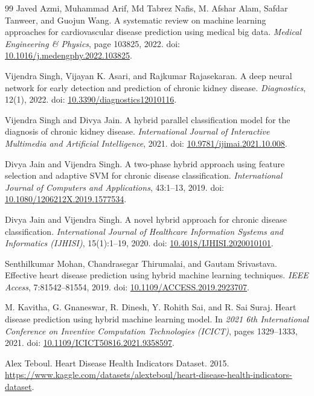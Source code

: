 \begin{thebibliography}{99}
 Javed Azmi, Muhammad Arif, Md Tabrez Nafis, M. Afshar Alam, Safdar Tanweer, and Guojun Wang. A systematic review on machine learning approaches for cardiovascular disease prediction using medical big data. \emph{Medical Engineering \& Physics}, page 103825, 2022. doi: \href{https://doi.org/10.1016/j.medengphy.2022.103825}{10.1016/j.medengphy.2022.103825}.

 Vijendra Singh, Vijayan K. Asari, and Rajkumar Rajasekaran. A deep neural network for early detection and prediction of chronic kidney disease. \emph{Diagnostics}, 12(1), 2022. doi: \href{https://doi.org/10.3390/diagnostics12010116}{10.3390/diagnostics12010116}.

 Vijendra Singh and Divya Jain. A hybrid parallel classification model for the diagnosis of chronic kidney disease. \emph{International Journal of Interactive Multimedia and Artificial Intelligence}, 2021. doi: \href{https://doi.org/10.9781/ijimai.2021.10.008}{10.9781/ijimai.2021.10.008}.

 Divya Jain and Vijendra Singh. A two-phase hybrid approach using feature selection and adaptive SVM for chronic disease classification. \emph{International Journal of Computers and Applications}, 43:1--13, 2019. doi: \href{https://doi.org/10.1080/1206212X.2019.1577534}{10.1080/1206212X.2019.1577534}.

 Divya Jain and Vijendra Singh. A novel hybrid approach for chronic disease classification. \emph{International Journal of Healthcare Information Systems and Informatics (IJHISI)}, 15(1):1--19, 2020. doi: \href{https://doi.org/10.4018/IJHISI.2020010101}{10.4018/IJHISI.2020010101}.

 Senthilkumar Mohan, Chandrasegar Thirumalai, and Gautam Srivastava. Effective heart disease prediction using hybrid machine learning techniques. \emph{IEEE Access}, 7:81542--81554, 2019. doi: \href{https://doi.org/10.1109/ACCESS.2019.2923707}{10.1109/ACCESS.2019.2923707}.

 M. Kavitha, G. Gnaneswar, R. Dinesh, Y. Rohith Sai, and R. Sai Suraj. Heart disease prediction using hybrid machine learning model. In \emph{2021 6th International Conference on Inventive Computation Technologies (ICICT)}, pages 1329--1333, 2021. doi: \href{https://doi.org/10.1109/ICICT50816.2021.9358597}{10.1109/ICICT50816.2021.9358597}.

 Alex Teboul. Heart Disease Health Indicators Dataset. 2015. \url{https://www.kaggle.com/datasets/alexteboul/heart-disease-health-indicators-dataset}.


\end{thebibliography}
